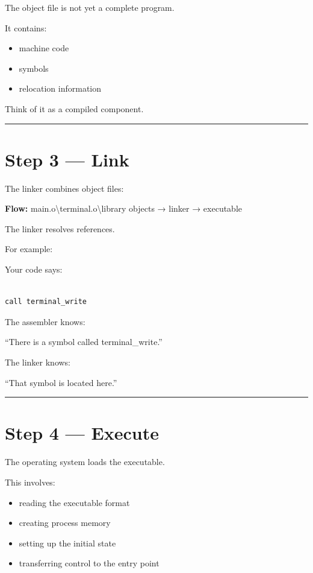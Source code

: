 \documentclass[
  oneside,
  openany]{book}
\providecommand{\tightlist}{%
  \setlength{\itemsep}{0pt}\setlength{\parskip}{0pt}}
\begin{document}
The object file is not yet a complete program.

It contains:

\begin{itemize}
\tightlist
\item
  machine code
\item
  symbols
\item
  relocation information
\end{itemize}

Think of it as a compiled component.

\begin{center}\rule{0.5\linewidth}{0.5pt}\end{center}

\hypertarget{step-3-link}{%
\section{Step 3 --- Link}\label{step-3-link}}

The linker combines object files:

\textbf{Flow:} main.o\textbackslash terminal.o\textbackslash library
objects → linker → executable

The linker resolves references.

For example:

Your code says:

\begin{verbatim}

call terminal_write
\end{verbatim}

The assembler knows:

``There is a symbol called terminal\_write.''

The linker knows:

``That symbol is located here.''

\begin{center}\rule{0.5\linewidth}{0.5pt}\end{center}

\hypertarget{step-4-execute}{%
\section{Step 4 --- Execute}\label{step-4-execute}}

The operating system loads the executable.

This involves:

\begin{itemize}
\tightlist
\item
  reading the executable format
\item
  creating process memory
\item
  setting up the initial state
\item
  transferring control to the entry point
\end{itemize}
\end{document}
